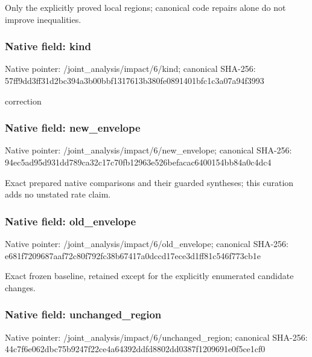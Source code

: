 \documentclass[10pt,a4paper]{article}
\begin{document}
\begingroup\raggedright\sloppy Only the explicitly proved local regions;\allowbreak{} canonical code repairs alone do not improve inequalities.\par\endgroup

\subsubsection{Native field: kind}
Native pointer: /joint\_\allowbreak{}analysis/impact/6/kind; canonical SHA-256: 57ff9dd3ff31d2bc394a3b00bbf1317613b380fe0891401bfc1c3a07a94f3993

\begingroup\raggedright\sloppy correction\par\endgroup

\subsubsection{Native field: new\_\allowbreak{}envelope}
Native pointer: /joint\_\allowbreak{}analysis/impact/6/new\_\allowbreak{}envelope; canonical SHA-256: 94ec5ad95d931dd789ca32c17c70fb12963e526befacac6400154bb84a0c4dc4

\begingroup\raggedright\sloppy Exact prepared native comparisons and their guarded syntheses;\allowbreak{} this curation adds no unstated rate claim.\par\endgroup

\subsubsection{Native field: old\_\allowbreak{}envelope}
Native pointer: /joint\_\allowbreak{}analysis/impact/6/old\_\allowbreak{}envelope; canonical SHA-256: e681f7209687aaf72c80f792fc38b67417a0dccd17ece3d1ff81c546f773cb1e

\begingroup\raggedright\sloppy Exact frozen baseline,\allowbreak{} retained except for the explicitly enumerated candidate changes.\par\endgroup

\subsubsection{Native field: unchanged\_\allowbreak{}region}
Native pointer: /joint\_\allowbreak{}analysis/impact/6/unchanged\_\allowbreak{}region; canonical SHA-256: 44c7f6e062dbc75b9247f22ce4a64392ddfd8802dd0387f1209691e0f5ce1cf0
\end{document}
